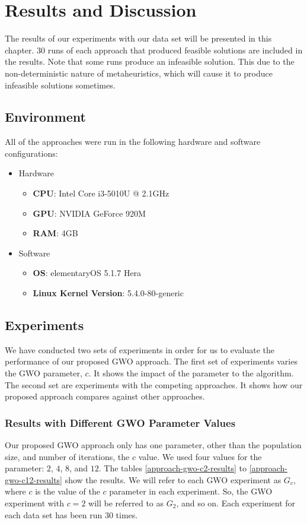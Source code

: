 \chapter{Results and Discussion}
The results of our experiments with our data set will be presented in this chapter. 30 runs of each approach that produced feasible solutions are included in the results. Note that some runs produce an infeasible solution. This due to the non-deterministic nature of metaheuristics, which will cause it to produce infeasible solutions sometimes.

\section{Environment}
All of the approaches were run in the following hardware and software configurations:

\begin{itemize}
	\item Hardware
	\begin{itemize}
		\item \textbf{CPU}: Intel Core i3-5010U @ 2.1GHz
		\item \textbf{GPU}: NVIDIA GeForce 920M
		\item \textbf{RAM}: 4GB
	\end{itemize}
	\item Software
	\begin{itemize}
		\item \textbf{OS}: elementaryOS 5.1.7 Hera
		\item \textbf{Linux Kernel Version}: 5.4.0-80-generic
	\end{itemize}
\end{itemize}

\section{Experiments}
We have conducted two sets of experiments in order for us to evaluate the performance of our proposed GWO approach. The first set of experiments varies the GWO parameter, $c$. It shows the impact of the parameter to the algorithm. The second set are experiments with the competing approaches. It shows how our proposed approach compares against other approaches.

\subsection{Results with Different GWO Parameter Values}
Our proposed GWO approach only has one parameter, other than the population size, and number of iterations, the $c$ value. We used four values for the parameter: $2$, $4$, $8$, and $12$. The tables \ref{approach-gwo-c2-results} to \ref{approach-gwo-c12-results} show the results. We will refer to each GWO experiment as $G_{c}$, where $c$ is the value of the $c$ parameter in each experiment. So, the GWO experiment with $c = 2$ will be referred to as $G_{2}$, and so on. Each experiment for each data set has been run 30 times.

